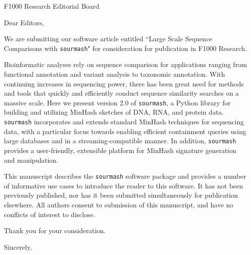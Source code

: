 \documentclass[11pt,letterpaper,oneside]{ucletter}
\begin{document}
\begin{letter}
{F1000 Research Editorial Board} 

\opening{Dear Editors,}


We are submitting our software article entitled ``Large Scale Sequence Comparisons with \lstinline{sourmash}" for consideration for publication in F1000 Research. 

Bioinformatic analyses rely on sequence comparison for applications ranging from functional annotation and variant analysis to taxonomic annotation. With continuing increases in sequencing power, there has been great need for methods and tools that quickly and efficiently conduct sequence similarity searches on a massive scale. Here we present version 2.0 of \lstinline{sourmash}, a Python library for building and utilizing MinHash sketches of DNA, RNA, and protein data. \lstinline{sourmash} incorporates and extends standard MinHash techniques for sequencing data, with a particular focus towards enabling efficient containment queries using large databases and in a streaming-compatible manner. In addition, \lstinline{sourmash} provides a user-friendly, extensible platform for MinHash signature generation and manipulation.

This manuscript describes the \lstinline{sourmash} software package and provides a number of informative use cases to introduce the reader to this software. It has not been previously published, nor has it been submitted simultaneously for publication elsewhere. All authors consent to submission of this manuscript, and have no conflicts of interest to disclose.


Thank you for your consideration.

\closing{Sincerely,}

\end{letter}
\end{document}
